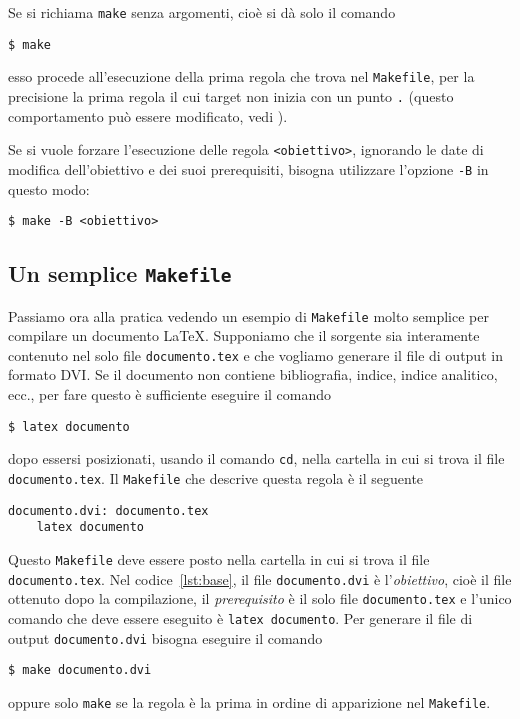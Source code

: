 Se si richiama \texttt{make} senza argomenti, cioè si dà solo il comando
\begin{verbatim}
$ make
\end{verbatim} %
esso procede all'esecuzione della prima regola che trova nel \texttt{Makefile},
per la precisione la prima regola il cui target non inizia con un punto \texttt{.}
(questo comportamento può essere modificato, vedi \textcite[5]{gnu:make}).

Se si vuole forzare l'esecuzione delle regola \texttt{<obiettivo>}, ignorando le
date di modifica dell'obiettivo e dei suoi prerequisiti, bisogna utilizzare
l'opzione \texttt{-B} in questo modo:
\begin{verbatim}
$ make -B <obiettivo>
\end{verbatim} %

\subsection{Un semplice \texttt{Makefile}}
\label{sec:makefile-semplice}

Passiamo ora alla pratica vedendo un esempio di \texttt{Makefile} molto semplice
per compilare un documento \LaTeX{}.
Supponiamo che il sorgente sia interamente contenuto nel solo file
\texttt{documento.tex} e che vogliamo generare il file di output in formato DVI.
Se il documento non contiene bibliografia, indice, indice analitico, ecc., per
fare questo è sufficiente eseguire il comando
\begin{verbatim}
$ latex documento
\end{verbatim} %
dopo essersi posizionati, usando il comando \texttt{cd}, nella cartella in cui
si trova il file \texttt{documento.tex}.  Il \texttt{Makefile} che descrive
questa regola è il seguente
\begin{lstlisting}[caption={Un semplice \texttt{Makefile}.},label=lst:base]
documento.dvi: documento.tex
	latex documento
\end{lstlisting}
Questo \texttt{Makefile} deve essere posto nella cartella in cui si trova il
file \texttt{documento.tex}.  Nel codice~\ref{lst:base}, il file
\texttt{documento.dvi} è l'\emph{obiettivo}, cioè il file ottenuto dopo la
compilazione, il \emph{prerequisito} è il solo file \texttt{documento.tex} e
l'unico comando che deve essere eseguito è \texttt{latex documento}.  Per
generare il file di output \texttt{documento.dvi} bisogna eseguire il comando
\begin{verbatim}
$ make documento.dvi
\end{verbatim} %
oppure solo \texttt{make} se la regola è la prima in ordine di apparizione nel
\texttt{Makefile}.

